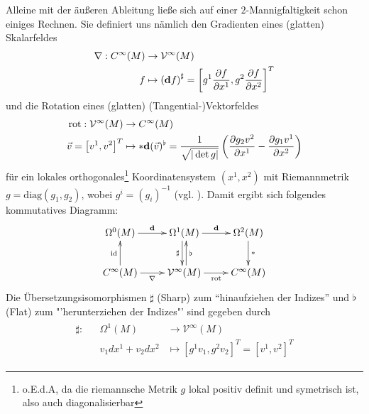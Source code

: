   Alleine mit der äußeren Ableitung ließe sich auf einer \( 2 \)-Mannigfaltigkeit schon einiges Rechnen.
  Sie definiert uns nämlich den Gradienten eines (glatten) Skalarfeldes 
  \begin{align}
    \begin{aligned}
      \nabla: C^{\infty}(M) &\rightarrow \mathcal{V}^{\infty}(M) \\
                            f  &\mapsto \left( \mathbf{d} f \right)^{\sharp}
                                        = \left[ g^{1} \frac{\partial f}{\partial x^{1}}, g^{2} \frac{\partial f}{\partial x^{2}} \right]^{T}
    \end{aligned}
  \end{align}
  und die Rotation eines (glatten) (Tangential-)Vektorfeldes
  \begin{align}
    \begin{aligned}
      \text{rot}: \mathcal{V}^{\infty}(M) &\rightarrow C^{\infty}(M) \\
                \vec{v} = \left[ v^{1}, v^{2} \right]^{T} &\mapsto * \mathbf{d} (\vec{v})^{\flat}
                                                           = \frac{1}{\sqrt{|\det g|}}\left( \frac{\partial g_{2}v^{2}}{\partial x^{1}} -  \frac{\partial g_{1}v^{1}}{\partial x^{2}}\right)
    \end{aligned}
  \end{align}
  für ein lokales orthogonales\footnote{o.E.d.A, da die riemannsche Metrik \( g  \) lokal positiv definit und symetrisch ist, also auch diagonalisierbar} 
  Koordinatensystem \( (x^{1}, x^{2}) \) mit Riemannmetrik \( g = \text{diag}(g_{1},g_{2}) \), wobei \( g^{i}=(g_{i})^{-1} \) (vgl. \cite{nitschke}). 
  Damit ergibt sich folgendes kommutatives Diagramm:
  \begin{align}
    \begin{xy} \xymatrix{
      \Omega^{0}(M) \ar[r]^{\exd} & \Omega^{1}(M) \ar[r]^{\exd} \ar@<-2pt>[d]_{\sharp} & \Omega^{2}(M) \ar[d]^{*}\\
      C^{\infty}(M) \ar[r]_{\nabla} \ar[u]^{\text{id}} & \mathcal{V}^{\infty}(M) \ar[r]_{\text{rot}} \ar@<-2pt>[u]_{\flat} & C^{\infty}(M) }
    \end{xy}
  \end{align}
  Die Übersetzungsisomorphismen \( \sharp \) (Sharp) zum "`hinaufziehen der Indizes"' und \( \flat \) (Flat) zum "'herunterziehen der Indizes"' sind gegeben durch
  \begin{align}
    \begin{aligned}
      \sharp:&& \Omega^{1}(M) &\rightarrow \mathcal{V}^{\infty}(M) \\
            &&   v_{1} dx^{1} + v_{2} dx^{2} &\mapsto \left[ g^{1}v_{1}, g^{2}v_{2} \right]^{T} = \left[ v^{1}, v^{2} \right]^{T}
    \end{aligned}
  \end{align}
